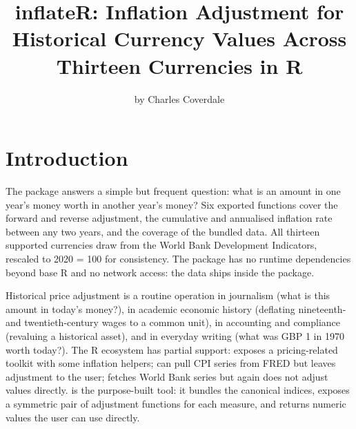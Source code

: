 \title{inflateR: Inflation Adjustment for Historical Currency Values Across Thirteen Currencies in R}


\author{by Charles Coverdale}

\maketitle


\section{Introduction}\label{introduction}

The  package answers a simple but frequent
question: what is an amount in one year's money worth in another
year's money? Six exported functions cover the forward and reverse
adjustment, the cumulative and annualised inflation rate between
any two years, and the coverage of the bundled data. All thirteen
supported currencies draw from the World Bank Development
Indicators, rescaled to 2020 = 100 for consistency. The package has
no runtime dependencies beyond base R and no network access: the
data ships inside the package.

Historical price adjustment is a routine operation in journalism
(what is this amount in today's money?), in academic economic
history (deflating nineteenth- and twentieth-century wages to a
common unit), in accounting and compliance (revaluing a historical
asset), and in everyday writing (what was GBP 1 in 1970 worth
today?). The R ecosystem has partial support: 
exposes a pricing-related toolkit with some inflation helpers;
 can pull CPI series from FRED but leaves
adjustment to the user;  fetches World Bank series but
again does not adjust values directly.  is the
purpose-built tool: it bundles the canonical indices, exposes a
symmetric pair of adjustment functions for each measure, and
returns numeric values the user can use directly.

